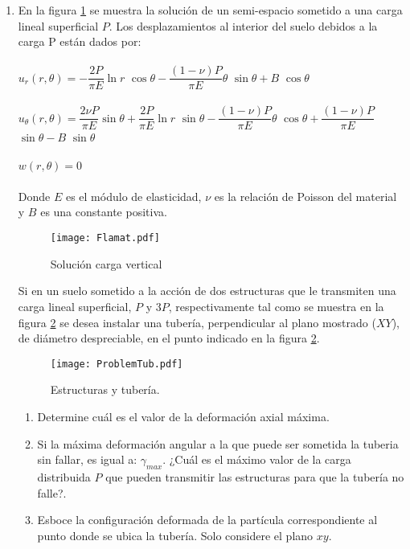 \documentclass[../notas medios.tex]{subfiles}
\begin{document}
\begin{enumerate}
\item \label{punto07_d}  En la figura \cref{Solucion_Flamant} se  muestra la solución de un semi-espacio sometido a una carga lineal superficial $P$.  Los desplazamientos al interior del suelo debidos a la carga P est\'an dados por:  \\\\
%
 $ u_r (r,\theta) = -\dfrac{2P}{\pi{E}} \ln{r}$ ${\cos \theta} -\dfrac{(1 - \nu)P}{\pi{E}} {\theta}$ $ {\sin\theta} + B $ $ {\cos \theta} $ \\\\
$ u_{\theta}(r,\theta) = \dfrac{2{\nu}P}{\pi{E}} \sin\theta + \dfrac{2P}{\pi{E}}\ln{r}$ $\sin\theta -\dfrac{(1 - \nu)P} {\pi{E}} 
	{\theta}$ $ {\cos\theta} + \dfrac{(1 - \nu)P}{\pi{E}}$ ${\sin\theta} - B$ $ {\sin\theta}$	\\\\
$ w (r,\theta) = 0$ \\\\
%
\noindent Donde $E$ es el m\'odulo de elasticidad,  $\nu$ es la relaci\'on de Poisson del material y $B$ es una constante positiva.
%
\begin{figure}[H]
	\centering
		\texttt{[image: Flamat.pdf]} 
		\caption{Soluci\'on carga vertical}
		\label{Solucion_Flamant}
\end{figure}
%
Si en un suelo sometido a la acción de dos estructuras que le transmiten  una carga lineal superficial, $P$ y $3P$, respectivamente tal como se muestra en la figura  \cref{figure3} se desea instalar una tuber\'ia, perpendicular al plano mostrado ($XY$), de di\'ametro despreciable, en el punto indicado  en la figura \cref{figure3}.
%		
\begin{figure}[H]
	\centering
	\texttt{[image: ProblemTub.pdf]} 
	\caption{Estructuras y tuber\'ia.}
	\label{figure3}
\end{figure} 
\begin{enumerate}
%
	\item Determine cuál es el valor de la deformación axial máxima.
	\item  Si la máxima deformaci\'on angular a la que puede ser sometida la 
	tuberia sin fallar, es igual a: $\gamma_{max}$. ¿Cu\'al es el máximo valor 
	de la carga distribuida $P$ que pueden transmitir las estructuras para que 
	la tuber\'ia no falle?. 
	\item Esboce la configuraci\'on deformada de la part\'icula correspondiente al punto donde se ubica la tuber\'ia. Solo considere el plano $xy$. 

\end{enumerate}
\end{enumerate}
\end{document}
